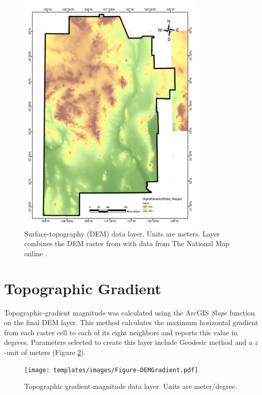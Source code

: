 \begin{figure}[H]
\centering
\includegraphics[width=0.8\textwidth]{templates/images/Figure-DEM.pdf}
\caption[Surface topography (DEM) data layer]{Surface-topography (DEM) data layer. Units are meters. Layer combines the DEM raster from \citet{bielicki_hydrogeolgic_2015} with data from The National Map online \citep{usgs_tnm_2021}.}
\label{fig:feat_dem}
\end{figure}

\section{Topographic Gradient}\label{app:dl_dem_gradient}

Topographic-gradient magnitude was calculated using the ArcGIS \textit{Slope} function on the final DEM layer. This method calculates the maximum horizontal gradient from each raster cell to each of its eight neighbors and reports this value in degrees. Parameters selected to create this layer include Geodesic method and a $z$-unit of meters (Figure \ref{fig:feat_dem_gradient}).

\begin{figure}[H]
\centering
\texttt{[image: templates/images/Figure-DEMGradient.pdf]}
\caption[Topographic gradient data layer]{Topographic gradient-magnitude data layer. Units are meter/degree.}
\label{fig:feat_dem_gradient}
\end{figure}

